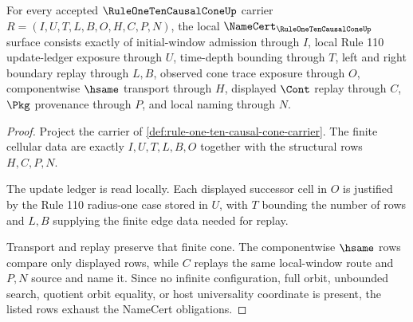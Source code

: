\begin{theorem}
\label{thm:rule-one-ten-causal-cone-namecert-obligations}
For every accepted $\RuleOneTenCausalConeUp$ carrier
$R=(I,U,T,L,B,O,H,C,P,N)$, the local
$\NameCert_{\RuleOneTenCausalConeUp}$ surface consists exactly of initial-window
admission through $I$, local Rule 110 update-ledger exposure through $U$,
time-depth bounding through $T$, left and right boundary replay through $L,B$,
observed cone trace exposure through $O$, componentwise $\hsame$ transport
through $H$, displayed $\Cont$ replay through $C$, $\Pkg$ provenance through
$P$, and local naming through $N$.
\end{theorem}
\begin{proof}
Project the carrier of \autoref{def:rule-one-ten-causal-cone-carrier}. The
finite cellular data are exactly $I,U,T,L,B,O$ together with the structural rows
$H,C,P,N$.

The update ledger is read locally. Each displayed successor cell in $O$ is
justified by the Rule 110 radius-one case stored in $U$, with $T$ bounding the
number of rows and $L,B$ supplying the finite edge data needed for replay.

Transport and replay preserve that finite cone. The componentwise $\hsame$ rows
compare only displayed rows, while $C$ replays the same local-window route and
$P,N$ source and name it. Since no infinite configuration, full orbit,
unbounded search, quotient orbit equality, or host universality coordinate is
present, the listed rows exhaust the NameCert obligations.
\end{proof}

\begin{closurestatus}{\RuleOneTenCausalConeUp}
  \theoryclosure{\seedClosure}
  \formalstatus{\unformalizedV}
\end{closurestatus}
